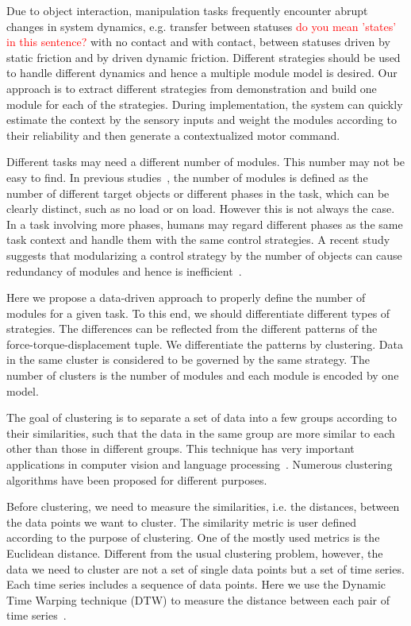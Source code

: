 Due to object interaction, manipulation tasks frequently encounter abrupt changes in system dynamics, e.g. transfer between statuses \textcolor{red}{do you mean 'states' in this sentence?} with no contact and with contact, between statuses driven by static friction and by driven dynamic friction. Different strategies should be used to handle different dynamics and hence a multiple module model is desired. Our approach is to extract different strategies from demonstration and build one module for each of the strategies. During implementation, the system can quickly estimate the context by the sensory inputs and weight the modules according to their reliability and then generate a contextualized motor command.

Different tasks may need a different number of modules. This number may not be easy to find. In previous studies~\cite{sugimoto2012emosaic,haruno2001mosaic}, the number of modules is defined as the number of different target objects or different phases in the task, which can be clearly distinct, such as no load or on load. However this is not always the case. In a task involving more phases, humans may regard different phases as the same task context and handle them with the same control strategies. A recent study suggests that modularizing a control strategy by the number of objects can cause redundancy of modules and hence is inefficient~\cite{lallee2009}.

Here we propose a data-driven approach to properly define the number of modules for a given task.
To this end, we should differentiate different types of strategies. The differences can be reflected from the different patterns of the force-torque-displacement tuple. We differentiate the patterns by clustering. Data in the same cluster is considered to be governed by the same strategy. The number of clusters is the number of modules and each module is encoded by one model.


The goal of clustering is to separate a set of data into a few groups according to their similarities, such that the data in the same group are more similar to each other than those in different groups. This technique has very important applications in computer vision and language processing~\cite{warren2005clustering}. Numerous clustering algorithms have been proposed for different purposes.

Before clustering, we need to measure the similarities, i.e. the distances, between the data points we want to cluster. The similarity metric is user defined according to the purpose of clustering. One of the mostly used metrics is the Euclidean distance. Different from the usual clustering problem, however, the data we need to cluster are not a set of single data points but a set of time series. Each time series includes a sequence of data points. Here we use the Dynamic Time Warping technique (DTW) to measure the distance between each pair of time series~\cite{berndt1994using}.

